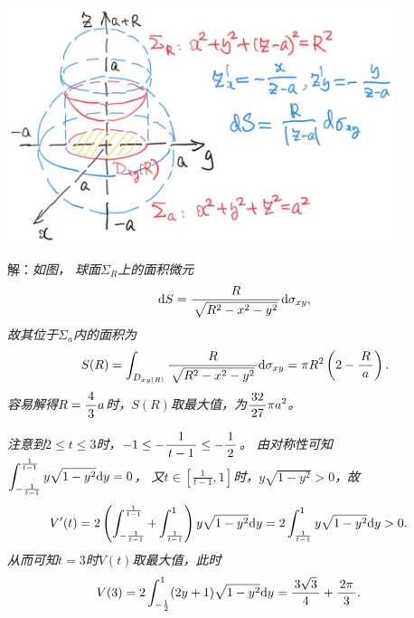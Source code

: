 \begin{frame}
	\linespread{1.5}
	
	\begin{center}
		\includegraphics[width=0.85\textwidth]{./images/ch10/10.4.3.jpg}
	\end{center}
\end{frame}

\begin{frame}
	\linespread{1.5}
	\small 解：\it 如图，
	球面$\Sigma_R$上的面积微元
	$$\mathrm{d} S=\displaystyle\frac{\,{R}\,}{\,{\sqrt{R^2-x^2-y^2}}\,}\mathrm{d}\sigma_{xy},$$
	故其位于$\Sigma_a$内的面积为
	$$S(R)=\displaystyle\int_{D_{xy(R)}}\displaystyle\frac{\,{R}\,}{\,{\sqrt{R^2-x^2-y^2}}\,}\mathrm{d}\sigma_{xy}
	=\pi R^2\left(2-\displaystyle\frac{\,{R}\,}{\,{a}\,}\right).$$
	容易解得$R=\displaystyle\frac{\,{4}\,}{\,{3}\,}a$时，$S(R)$取最大值，为$\displaystyle\frac{\,{32}\,}{\,{27}\,}\pi a^2$。\fin
\end{frame}

\begin{frame}
	\linespread{1.5}
	\small\it 
	注意到$2\leq t\leq 3$时，$-1\leq-\displaystyle\frac{\,{1}\,}{\,{t-1}\,}\leq-\displaystyle\frac{\,{1}\,}{\,{2}\,}$。
	由对称性可知
	$\displaystyle\int_{-\frac1{t-1}}^{\frac1{t-1}}y\sqrt{1-y^2}\mathrm{d} y=0$，
	又$t\in\left[\frac1{t-1},1\right]$时，$y\sqrt{1-y^2}>0$，故
	\begin{align*}
		V'(t)&=2\left(\displaystyle\int_{-\frac1{t-1}}^{\frac1{t-1}}+
		\displaystyle\int_{\frac1{t-1}}^1\right)y\sqrt{1-y^2}\mathrm{d} y
		=2\displaystyle\int_{\frac1{t-1}}^1y\sqrt{1-y^2}\mathrm{d} y>0.
	\end{align*}
	从而可知$t=3$时$V(t)$取最大值，此时
	\begin{align*}
		V(3)&=2\displaystyle\int_{-\frac12}^1(2y+1)\sqrt{1-y^2}\mathrm{d} y
		=\displaystyle\frac{\,{3\sqrt3}\,}{\,{4}\,}+\displaystyle\frac{\,{2\pi}\,}{\,{3}\,}.
	\end{align*}
	\fin
\end{frame}


